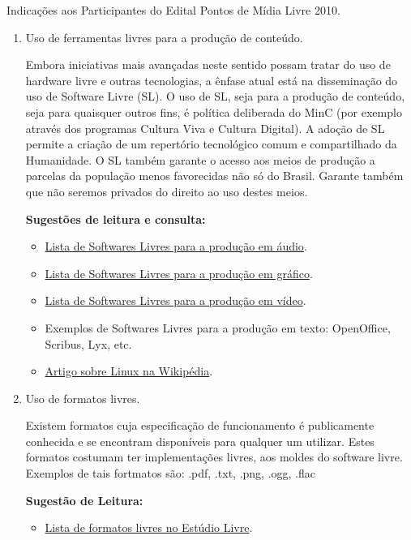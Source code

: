 \documentclass{letter}[20pt]
\begin{document}
\begin{letter}{Indicações aos Participantes do Edital Pontos de Mídia Livre 2010.}
\begin{enumerate}
\vfill
  \item Uso de ferramentas livres para a produção de conteúdo.

    Embora iniciativas mais avançadas neste sentido possam tratar do uso de hardware livre e outras tecnologias, a ênfase atual está na disseminação do uso de Software Livre (SL). O uso de SL, seja para a produção de conteúdo, seja para quaisquer outros fins, é política deliberada do MinC (por exemplo através dos programas Cultura Viva e Cultura Digital). A adoção de SL permite a criação de um repertório tecnológico comum e compartilhado da Humanidade. O SL também garante o acesso aos meios de produção a parcelas da população menos favorecidas não só do Brasil. Garante também que não seremos privados do direito ao uso destes meios.

    {\bf Sugestões de leitura e consulta:}
    \begin{itemize}
      \renewcommand{\labelitemi}{$\rightarrow$}
      \item \href{http://estudiolivre.org/tiki-index.php?page=Softwares\%20de\%20\%C3\%81udio}{Lista de Softwares Livres para a produção em áudio}.
      \item \href{http://estudiolivre.org/tiki-index.php?page=Softwares\%20de\%20Gr\%C3\%A1fico}{Lista de Softwares Livres para a produção em gráfico}.
      \item \href{http://estudiolivre.org/tiki-index.php?page=Softwares\%20de\%20V\%C3\%ADdeo}{Lista de Softwares Livres para a produção em vídeo}.
      \item Exemplos de Softwares Livres para a produção em texto: 
  OpenOffice, Scribus, Lyx, etc.
      \item \href{http://pt.wikipedia.org/wiki/Linux}{Artigo sobre Linux na Wikipédia}.
    \end{itemize}
  \vspace{1cm}



  \item Uso de formatos livres.

  Existem formatos cuja especificação de funcionamento é publicamente conhecida e se encontram disponíveis para qualquer um utilizar. Estes formatos costumam ter implementações livres, aos moldes do software livre. Exemplos de tais fortmatos são: .pdf, .txt, .png, .ogg, .flac

  {\bf Sugestão de Leitura:}
  \begin{itemize}
    \renewcommand{\labelitemi}{$\rightarrow$}
    \item \href{http://www.estudiolivre.org/tiki-index.php?page=midia\%20livre\#formatos\_livres}{Lista de formatos livres no Estúdio Livre}.
  \end{itemize}
  \vspace{1cm}




\end{enumerate}
\end{letter}
\end{document}
